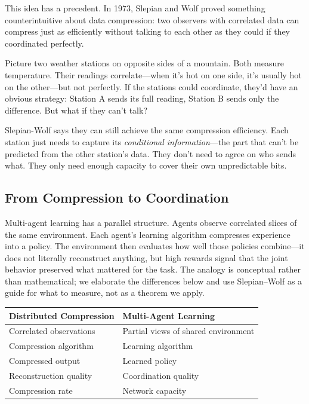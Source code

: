 \documentclass[10pt, letterpaper]{article}
\begin{document}
This idea has a precedent. In 1973, Slepian and Wolf proved something counterintuitive about data compression: two observers with correlated data can compress just as efficiently without talking to each other as they could if they coordinated perfectly.

Picture two weather stations on opposite sides of a mountain. Both measure temperature. Their readings correlate---when it's hot on one side, it's usually hot on the other---but not perfectly. If the stations could coordinate, they'd have an obvious strategy: Station A sends its full reading, Station B sends only the difference. But what if they can't talk?

Slepian-Wolf says they can still achieve the same compression efficiency. Each station just needs to capture its \emph{conditional information}---the part that can't be predicted from the other station's data. They don't need to agree on who sends what. They only need enough capacity to cover their own unpredictable bits.

\subsection*{From Compression to Coordination}

Multi-agent learning has a parallel structure. Agents observe correlated slices of the same environment. Each agent's learning algorithm compresses experience into a policy. The environment then evaluates how well those policies combine---it does not literally reconstruct anything, but high rewards signal that the joint behavior preserved what mattered for the task. The analogy is conceptual rather than mathematical; we elaborate the differences below and use Slepian--Wolf as a guide for what to measure, not as a theorem we apply.

\begin{center}
\begin{tabular}{ll}
\toprule
\textbf{Distributed Compression} & \textbf{Multi-Agent Learning} \\
\midrule
Correlated observations & Partial views of shared environment \\
Compression algorithm & Learning algorithm \\
Compressed output & Learned policy \\
Reconstruction quality & Coordination quality \\
Compression rate & Network capacity \\
\bottomrule
\end{tabular}
\end{center}
\end{document}
